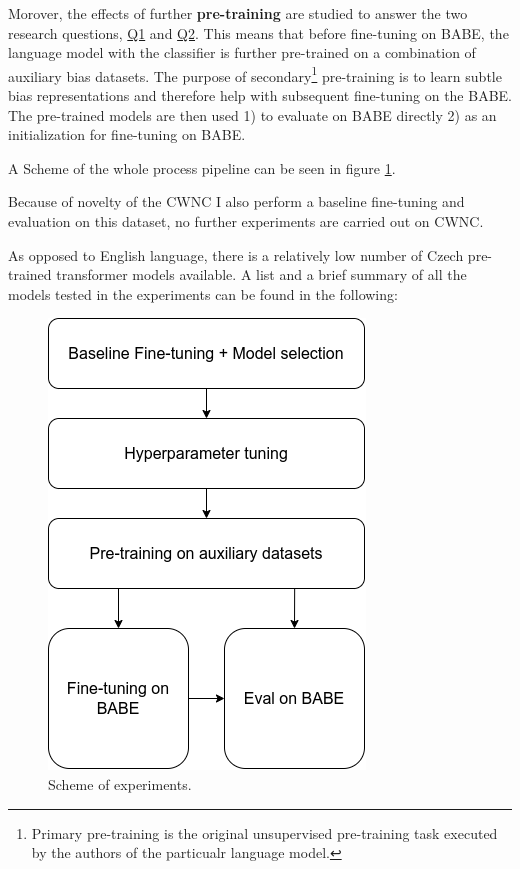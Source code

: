 Morover, the effects of further \textbf{pre-training} are studied to answer the two research questions, \hyperref[Q1]{Q1} and \hyperref[Q2]{Q2}. This means that before fine-tuning on BABE, the language model with the classifier is further pre-trained on a combination of auxiliary bias datasets. The purpose of secondary\footnote{Primary pre-training is the original unsupervised pre-training task executed by the authors of the particualr language model.} pre-training is to learn subtle bias representations and therefore help with subsequent fine-tuning on the BABE. The pre-trained models are then used 1) to evaluate on BABE directly 2) as an initialization for fine-tuning on BABE.

A Scheme of the whole process pipeline can be seen in figure \ref{fig:pipeline}.

\newpage
Because of novelty of the CWNC I also perform a baseline fine-tuning and evaluation on this dataset, no further experiments are carried out on CWNC.

As opposed to English language, there is a relatively low number of Czech pre-trained transformer models available. A list and a brief summary of all the models tested in the experiments can be found in the following:


\begin{figure}
  \includegraphics[scale=0.5]{my_modules/multimedia/pipeline.png}
  \caption{Scheme of experiments.}
  \label{fig:pipeline}
\end{figure}



